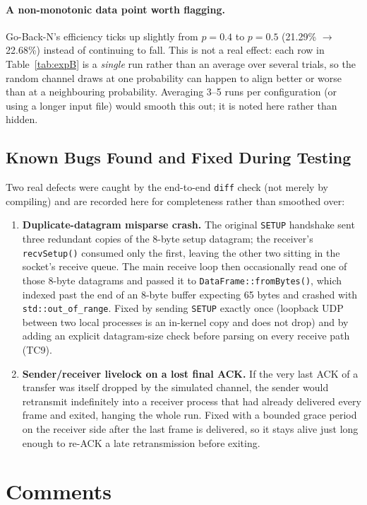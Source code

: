 \documentclass[11pt]{article}
\begin{document}
\paragraph{A non-monotonic data point worth flagging.} Go-Back-N's efficiency ticks up
slightly from $p{=}0.4$ to $p{=}0.5$ (21.29\% $\to$ 22.68\%) instead of continuing to fall.
This is not a real effect: each row in Table~\ref{tab:expB} is a \emph{single} run rather
than an average over several trials, so the random channel draws at one probability can
happen to align better or worse than at a neighbouring probability. Averaging 3--5 runs per
configuration (or using a longer input file) would smooth this out; it is noted here rather
than hidden.

\subsection{Known Bugs Found and Fixed During Testing}
Two real defects were caught by the end-to-end \texttt{diff} check (not merely by
compiling) and are recorded here for completeness rather than smoothed over:
\begin{enumerate}[leftmargin=1.6em]
  \item \textbf{Duplicate-datagram misparse crash.} The original \texttt{SETUP} handshake
  sent three redundant copies of the 8-byte setup datagram; the receiver's
  \texttt{recvSetup()} consumed only the first, leaving the other two sitting in the
  socket's receive queue. The main receive loop then occasionally read one of those 8-byte
  datagrams and passed it to \texttt{DataFrame::fromBytes()}, which indexed past the end of
  an 8-byte buffer expecting 65 bytes and crashed with \texttt{std::out\_of\_range}. Fixed
  by sending \texttt{SETUP} exactly once (loopback UDP between two local processes is an
  in-kernel copy and does not drop) and by adding an explicit datagram-size check before
  parsing on every receive path (TC9).
  \item \textbf{Sender/receiver livelock on a lost final ACK.} If the very last ACK of a
  transfer was itself dropped by the simulated channel, the sender would retransmit
  indefinitely into a receiver process that had already delivered every frame and exited,
  hanging the whole run. Fixed with a bounded grace period on the receiver side after the
  last frame is delivered, so it stays alive just long enough to re-ACK a late retransmission
  before exiting.
\end{enumerate}

\section{Comments}
\end{document}
